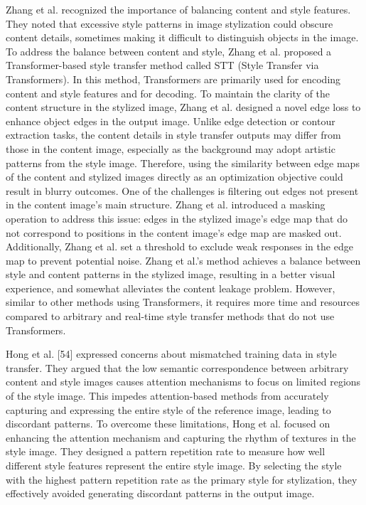 \documentclass[preprint,12pt]{elsarticle}
\begin{document}
Zhang et al.\citep{53zhang2023edge} recognized the importance of balancing content and style features. They noted that excessive style patterns in image stylization could obscure content details, sometimes making it difficult to distinguish objects in the image. To address the balance between content and style, Zhang et al. proposed a Transformer-based style transfer method called STT (Style Transfer via Transformers). In this method, Transformers are primarily used for encoding content and style features and for decoding. To maintain the clarity of the content structure in the stylized image, Zhang et al. designed a novel edge loss to enhance object edges in the output image. Unlike edge detection or contour extraction tasks, the content details in style transfer outputs may differ from those in the content image, especially as the background may adopt artistic patterns from the style image. Therefore, using the similarity between edge maps of the content and stylized images directly as an optimization objective could result in blurry outcomes. One of the challenges is filtering out edges not present in the content image's main structure. Zhang et al. introduced a masking operation to address this issue: edges in the stylized image's edge map that do not correspond to positions in the content image's edge map are masked out. Additionally, Zhang et al. set a threshold to exclude weak responses in the edge map to prevent potential noise. Zhang et al.’s method achieves a balance between style and content patterns in the stylized image, resulting in a better visual experience, and somewhat alleviates the content leakage problem. However, similar to other methods using Transformers, it requires more time and resources compared to arbitrary and real-time style transfer methods that do not use Transformers.

Hong et al. [54] expressed concerns about mismatched training data in style transfer. They argued that the low semantic correspondence between arbitrary content and style images causes attention mechanisms to focus on limited regions of the style image. This impedes attention-based methods from accurately capturing and expressing the entire style of the reference image, leading to discordant patterns. To overcome these limitations, Hong et al. focused on enhancing the attention mechanism and capturing the rhythm of textures in the style image. They designed a pattern repetition rate to measure how well different style features represent the entire style image. By selecting the style with the highest pattern repetition rate as the primary style for stylization, they effectively avoided generating discordant patterns in the output image. 
\end{document}
